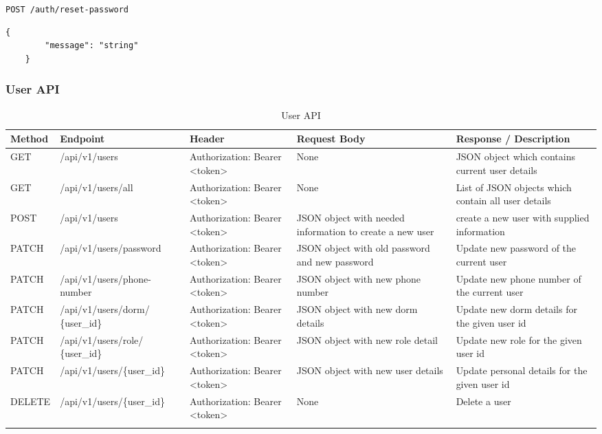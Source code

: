 \texttt{POST /auth/reset-password}
\begin{lstlisting}[breaklines=true, caption=Response of Reset Password API]
	{
		"message": "string"   
	}
\end{lstlisting}



\subsubsection{User API}
\begin{longtable}{|m{1.6cm}|m{5cm}|m{3cm}|m{3cm}|m{3.2cm}|}
	\hline
	\textbf{Method} & \textbf{Endpoint} & \textbf{Header}                                                                                                                            & \textbf{Request Body} & \textbf{Response / Description}   \\ \hline
	\endhead
	
	GET & /api/v1/users & Authorization: Bearer <token> & None & JSON object which contains current user details \\ \hline
	
	GET & /api/v1/users/all & Authorization: Bearer <token> & None  & List of JSON objects which contain all user details \\ \hline
	
	POST & /api/v1/users & Authorization: Bearer <token> & JSON object with needed information to create a new user & create a new user with supplied information \\ \hline
	
	PATCH & /api/v1/users/password & Authorization: Bearer <token>& JSON object with old password and new password & Update new password of the current user \\ \hline
	
	PATCH & /api/v1/users/phone-number & Authorization: Bearer <token>& JSON object with new phone number & Update new phone number of the current user \\ \hline
	
	PATCH & /api/v1/users/dorm/ \newline \{user\_id\} & Authorization: Bearer <token>& JSON object with new dorm details & Update new dorm details for the given user id \\ \hline
	
	PATCH & /api/v1/users/role/ \newline \{user\_id\} & Authorization: Bearer <token>& JSON object with new role detail & Update new role for the given user id \\ \hline
	
	PATCH & /api/v1/users/\{user\_id\} & Authorization: Bearer <token>& JSON object with new user details & Update personal details for the given user id \\ \hline
	
	
	DELETE & /api/v1/users/\{user\_id\} & Authorization: Bearer <token>& None & Delete a user \\ \hline

	
	
	\caption{User API}
	\label{tab:user-api}
	
\end{longtable}

